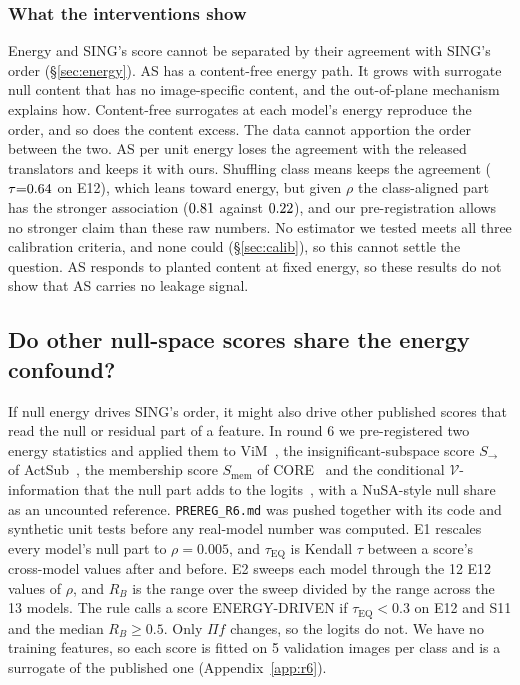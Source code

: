 \documentclass[10pt]{article}
\begin{document}
\subsubsection{What the interventions show}
Energy and SING's score cannot be separated by their agreement with SING's order (\S\ref{sec:energy}).
AS has a content-free energy path. It grows with surrogate null content that has no image-specific content, and the out-of-plane mechanism explains how.
Content-free surrogates at each model's energy reproduce the order, and so does the content excess. The data cannot apportion the order between the two.
AS per unit energy loses the agreement with the released translators and keeps it with ours.
Shuffling class means keeps the agreement ($\tau{=}0.64$ on E12), which leans toward energy, but given $\rho$ the class-aligned part has the stronger association ($0.81$ against $0.22$), and our pre-registration allows no stronger claim than these raw numbers. No estimator we tested meets all three calibration criteria, and none could (\S\ref{sec:calib}), so this cannot settle the question.
AS responds to planted content at fixed energy, so these results do not show that AS carries no leakage signal.

\subsection{Do other null-space scores share the energy confound?}
\label{sec:audit}
If null energy drives SING's order, it might also drive other published scores that read the null or residual part of a feature. In round 6 we pre-registered two energy statistics and applied them to ViM~\citep{vim2022}, the insignificant-subspace score $S_{\to}$ of ActSub~\citep{zongur2025actsub}, the membership score $S_{\mathrm{mem}}$ of CORE~\citep{yang2026core} and the conditional $\mathcal{V}$-information that the null part adds to the logits~\citep{hewitt2021conditional}, with a NuSA-style null share~\citep{cook2020} as an uncounted reference. \texttt{PREREG\_R6.md} was pushed together with its code and synthetic unit tests before any real-model number was computed. E1 rescales every model's null part to $\rho{=}0.005$, and $\tau_{\mathrm{EQ}}$ is Kendall $\tau$ between a score's cross-model values after and before. E2 sweeps each model through the 12 E12 values of $\rho$, and $R_B$ is the range over the sweep divided by the range across the 13 models. The rule calls a score ENERGY-DRIVEN if $\tau_{\mathrm{EQ}}{<}0.3$ on E12 and S11 and the median $R_B{\ge}0.5$. Only $\Pi f$ changes, so the logits do not. We have no training features, so each score is fitted on 5 validation images per class and is a surrogate of the published one (Appendix~\ref{app:r6}).
\end{document}
